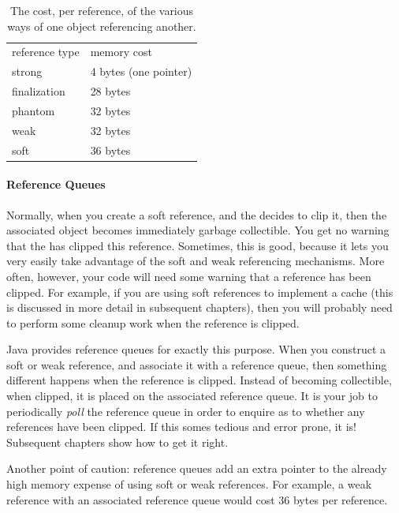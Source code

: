 \begin{table}
\centering
	\begin{tabular}{ll}
		\toprule
		reference type & memory cost \\
        \cmidrule(r){1-1} \cmidrule(l){2-2}		
		strong         & 4 bytes (one pointer) \\
		finalization   & 28 bytes \\
        phantom        & 32 bytes \\ 
		weak           & 32 bytes \\
		soft           & 36 bytes \\
		\bottomrule
	\end{tabular}
	\caption{The cost, per reference, of the various ways of one object
	referencing another.}
	\label{tab:reference-costs}
\end{table}


\paragraph{Reference Queues}
Normally, when you create a soft reference, and the \jre decides to clip it,
then the associated  object becomes immediately garbage
collectible. You get no warning that the \jre has clipped this reference.
Sometimes, this is good, because it lets you very easily take advantage of the
soft and weak referencing mechanisms. More often, however, your code will need
some warning that a reference has been clipped. For example, if you are using
soft references to implement a cache (this is discussed in more detail in
subsequent chapters), then you will probably need to perform some cleanup work
when the reference is clipped.

Java provides reference queues for exactly this purpose. When you construct a
soft or weak reference, and associate it with a reference queue, then something
different happens when the reference is clipped. Instead of becoming
collectible, when clipped, it is placed on the associated reference queue. It is
your job to periodically \emph{poll} the reference queue in order to enquire as
to whether any references have been clipped. If this somes tedious and error
prone, it is! Subsequent chapters show how to get it right.

Another point of caution: reference queues add an extra pointer to the already
high memory expense of using soft or weak references. For example, a weak
reference with an associated reference queue would cost 36 bytes per reference.

